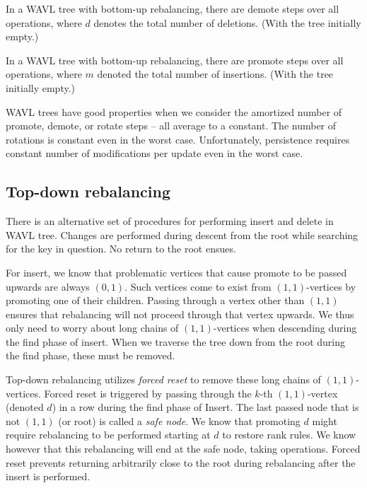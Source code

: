 \begin{thm}
In a WAVL tree with bottom-up rebalancing, there are  demote steps over all operations, where $d$ denotes the total number of deletions. (With the tree initially empty.)
\end{thm}

\begin{thm}
In a WAVL tree with bottom-up rebalancing, there are  promote steps over all operations, where $m$ denoted the total number of insertions. (With the tree initially empty.)
\end{thm}

WAVL trees have good properties when we consider the amortized number of promote, demote, or rotate steps -- all average to a constant. The number of rotations is constant even in the worst case. Unfortunately, persistence requires constant number of modifications per update even in the worst case.

\subsection{Top-down rebalancing}

There is an alternative set of procedures for performing insert and delete in WAVL tree. Changes are performed during descent from the root while searching for the key in question. No return to the root ensues.

For insert, we know that problematic vertices that cause promote to be passed upwards are always $(0,1)$. Such vertices come to exist from $(1,1)$-vertices by promoting one of their children. Passing through a vertex other than $(1,1)$ ensures that rebalancing will not proceed through that vertex upwards. We thus only need to worry about long chains of $(1,1)$-vertices when descending during the find phase of insert. When we traverse the tree down from the root during the find phase, these must be removed.

Top-down rebalancing utilizes \emph{forced reset} to remove these long chains of $(1,1)$-vertices. Forced reset is triggered by passing through the $k$-th $(1,1)$-vertex (denoted $d$) in a row during the find phase of Insert. The last passed node that is not $(1,1)$ (or root) is called a \textit{safe node}. We know that promoting $d$ might require rebalancing to be performed starting at $d$ to restore rank rules. We know however that this rebalancing will end at the safe node, taking  operations.
Forced reset prevents returning arbitrarily close to the root during rebalancing after the insert is performed.

